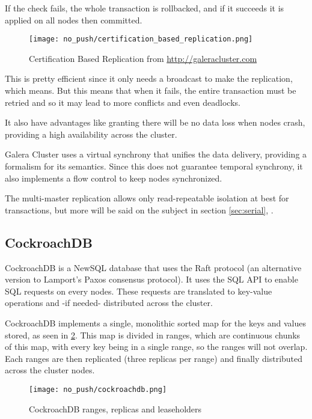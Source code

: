 \documentclass[a4paper, 10pt, titlepage]{report}
\begin{document}
If the check fails, the whole transaction is rollbacked, and if it succeeds it is applied on all nodes then committed.

\begin{figure}[H]
  \vspace{-10pt}
  \centering
  \centerline{\texttt{[image: no\_push/certification\_based\_replication.png]}}
  \vspace{-5pt}
  \caption{Certification Based Replication from \url{http://galeracluster.com} }
  \vspace{-5pt}
  \label{fig:certificationcommit}
\end{figure}


This is pretty efficient since it only needs a broadcast to make the replication, which means. But this means that when it fails, the entire transaction must be retried and so it may lead to more conflicts and even deadlocks.

It also have advantages like granting there will be no data loss when nodes crash, providing a high availability across the cluster.

Galera Cluster uses a virtual synchrony that unifies the data delivery, providing a formalism for its semantics. Since this does not guarantee temporal synchrony, it also implements a flow control to keep nodes synchronized.

The multi-master replication allows only read-repeatable isolation at best for transactions, but more will be said on the subject in section \ref{sec:serial}, \pageref{sec:serial}.


\subsection{CockroachDB}
CockroachDB is a NewSQL database that uses the Raft protocol (an alternative version to Lamport's Paxos consensus protocol).
It uses the SQL API to enable SQL requests on every nodes. These requests are translated to key-value operations and -if needed- distributed across the cluster.

CockroachDB implements a single, monolithic sorted map for the keys and values stored, as seen in \ref{fig:cockroachdb}. This map is divided in ranges, which are continuous chunks of this map, with every key being in a single range, so the ranges will not overlap. Each ranges are then replicated (three replicas per range) and finally distributed across the cluster nodes.\cite{CRDB:automatedoperations}

\begin{figure}[H]
  \vspace{-10pt}
  \centering
  \centerline{\texttt{[image: no\_push/cockroachdb.png]}}
  \vspace{-5pt}
  \caption{CockroachDB ranges, replicas and leaseholders}
  \vspace{-5pt}
  \label{fig:cockroachdb}
\end{figure}
\end{document}
